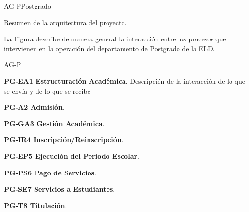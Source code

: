 


\begin{Arquitectura}{AG-P}{Postgrado} {

		Resumen de la arquitectura del proyecto.

		\noindent La Figura   describe de manera general la interacción entre los procesos que intervienen en la operación del departamento de Postgrado de la ELD.

		
	}{AG-P}

\end{Arquitectura}


\begin{ADescripcion}

	\item \textbf{PG-EA1 Estructuración Académica}. Descripción de la interacción de lo que se envía y de lo que se recibe	
	\item \textbf{PG-A2 Admisión}.
	\item \textbf{PG-GA3 Gestión Académica}. 
	\item \textbf{PG-IR4 Inscripción/Reinscripción}. 
	\item \textbf{PG-EP5 Ejecución del Periodo Escolar}. 
	\item \textbf{PG-PS6 Pago de Servicios}. 
	\item \textbf{PG-SE7 Servicios a Estudiantes}. 
	\item \textbf{PG-T8 Titulación}. 
	
\end{ADescripcion}
	 
